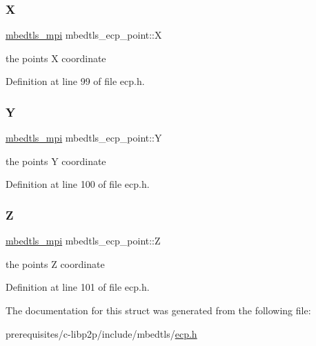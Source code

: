 \subsubsection{\texorpdfstring{X}{X}}
{\footnotesize\ttfamily \mbox{\hyperlink{structmbedtls__mpi}{mbedtls\+\_\+mpi}} mbedtls\+\_\+ecp\+\_\+point\+::X}

the point\textquotesingle{}s X coordinate 

Definition at line 99 of file ecp.\+h.

\mbox{\label{structmbedtls__ecp__point_af8fb56647185a0186c7a3c54eea30a4d}} 
\subsubsection{\texorpdfstring{Y}{Y}}
{\footnotesize\ttfamily \mbox{\hyperlink{structmbedtls__mpi}{mbedtls\+\_\+mpi}} mbedtls\+\_\+ecp\+\_\+point\+::Y}

the point\textquotesingle{}s Y coordinate 

Definition at line 100 of file ecp.\+h.

\mbox{\label{structmbedtls__ecp__point_a83c24649cb4c1ed8aae6449a29d094e5}} 
\subsubsection{\texorpdfstring{Z}{Z}}
{\footnotesize\ttfamily \mbox{\hyperlink{structmbedtls__mpi}{mbedtls\+\_\+mpi}} mbedtls\+\_\+ecp\+\_\+point\+::Z}

the point\textquotesingle{}s Z coordinate 

Definition at line 101 of file ecp.\+h.



The documentation for this struct was generated from the following file\+:\begin{DoxyCompactItemize}
\item 
prerequisites/c-\/libp2p/include/mbedtls/\mbox{\hyperlink{ecp_8h}{ecp.\+h}}\end{DoxyCompactItemize}
